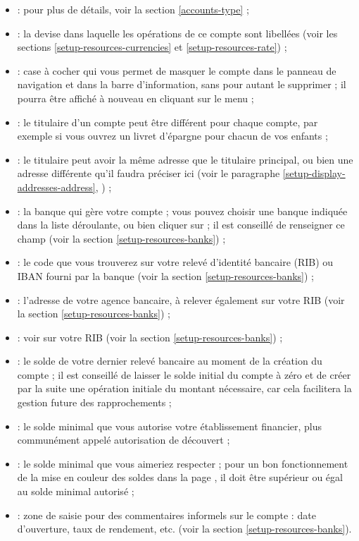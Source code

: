 \begin{itemize}
	\item {} : pour plus de détails, voir la section \vref{accounts-type} ;	
	\item {} : la devise dans laquelle les opérations de ce compte sont libellées (voir les sections \vref{setup-resources-currencies} et \vref{setup-resources-rate}) ;	
	\item {} : case à cocher qui vous permet de masquer le compte dans le panneau de navigation et dans la barre d'information, sans pour autant le supprimer ; il pourra être affiché à nouveau en cliquant sur le menu  ;	
	\item {} : le titulaire d'un compte peut être différent pour chaque compte, par exemple si vous ouvrez un livret d'épargne pour chacun de vos enfants ;	
	 \item {} : le titulaire peut avoir la même adresse que le titulaire principal, ou bien une adresse différente qu'il faudra préciser ici (voir le paragraphe \vref{setup-display-addresses-address}, ) ;
	\item {} : la banque qui gère votre compte ; vous pouvez choisir une banque indiquée dans la liste déroulante, ou bien cliquer sur  ; il est conseillé de renseigner ce champ (voir la section \vref{setup-resources-banks}) ;	
	\item {} : le code que vous trouverez sur votre relevé d'identité bancaire (RIB) ou IBAN fourni par la banque (voir la section \vref{setup-resources-banks}) ;	
	\item {} : l'adresse de votre agence bancaire, à relever également sur votre RIB (voir la section \vref{setup-resources-banks}) ;	
	\item {} : voir sur votre RIB (voir la section \vref{setup-resources-banks}) ;	
	\item {} : le solde de votre dernier relevé bancaire au moment de la création du compte ; il est conseillé de laisser le solde initial du compte à zéro et de créer par la suite une opération initiale du montant nécessaire, car cela facilitera la gestion future des rapprochements ;	
	\item {} : le solde minimal que vous autorise votre
	établissement financier, plus communément appelé autorisation de découvert ;	
	\item {} : le solde minimal que vous aimeriez respecter ; pour un bon fonctionnement de la mise en couleur des soldes dans la page , il doit être supérieur ou égal au solde minimal autorisé ;	
	\item {} : zone de saisie pour des commentaires informels sur le compte : date d'ouverture, taux de rendement, etc. (voir la section \vref{setup-resources-banks}).
\end{itemize}


